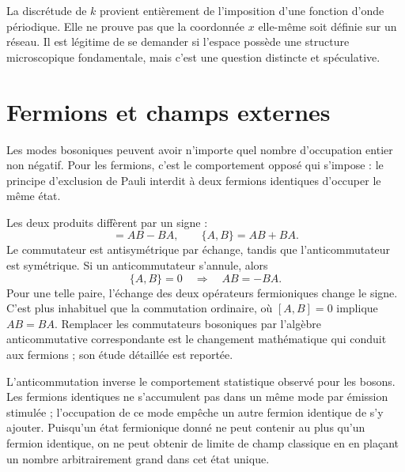 La discrétude de \(k\) provient entièrement de l’imposition d’une fonction d’onde périodique. Elle ne prouve pas que la coordonnée \(x\) elle-même soit définie sur un réseau. Il est légitime de se demander si l’espace possède une structure microscopique fondamentale, mais c’est une question distincte et spéculative.

\section{Fermions et champs externes}

Les modes bosoniques peuvent avoir n’importe quel nombre d’occupation entier non négatif. Pour les fermions, c’est le comportement opposé qui s’impose : le principe d’exclusion de Pauli interdit à deux fermions identiques d’occuper le même état.

\begin{classroomqa}\end{classroomqa}

Les deux produits diffèrent par un signe :
\begin{equation}
[A,B]=AB-BA,
\qquad
\{A,B\}=AB+BA.
\end{equation}
Le commutateur est antisymétrique par échange, tandis que l’anticommutateur est symétrique. Si un anticommutateur s’annule, alors
\begin{equation}
\{A,B\}=0
\quad\Longrightarrow\quad
AB=-BA.
\end{equation}
Pour une telle paire, l’échange des deux opérateurs fermioniques change le signe. C’est plus inhabituel que la commutation ordinaire, où \([A,B]=0\) implique \(AB=BA\). Remplacer les commutateurs bosoniques par l’algèbre anticommutative correspondante est le changement mathématique qui conduit aux fermions ; son étude détaillée est reportée.

L’anticommutation inverse le comportement statistique observé pour les bosons. Les fermions identiques ne s’accumulent pas dans un même mode par émission stimulée ; l’occupation de ce mode empêche un autre fermion identique de s’y ajouter. Puisqu’un état fermionique donné ne peut contenir au plus qu’un fermion identique, on ne peut obtenir de limite de champ classique en en plaçant un nombre arbitrairement grand dans cet état unique.


